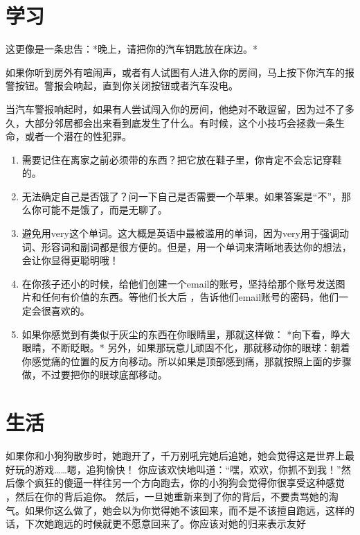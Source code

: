 \documentclass[12pt,oneside]{book}
\begin{document}
\chapter{学习}
\begin{proposition}[生活情调]
	这更像是一条忠告：*晚上，请把你的汽车钥匙放在床边。*
	
	如果你听到房外有喧闹声，或者有人试图有人进入你的房间，马上按下你汽车的报警按钮。警报会响起，直到你关闭按钮或者汽车没电。
	
	当汽车警报响起时，如果有人尝试闯入你的房间，他绝对不敢逗留，因为过不了多久，大部分邻居都会出来看到底发生了什么。有时候，这个小技巧会拯救一条生命，或者一个潜在的性犯罪。
\end{proposition}

\begin{tcolorbox}[colback=orange!5,colframe=orange!75!black]
\begin{enumerate}
\item 需要记住在离家之前必须带的东西？把它放在鞋子里，你肯定不会忘记穿鞋的。
\item 无法确定自己是否饿了？问一下自己是否需要一个苹果。如果答案是“不”，那么你可能不是饿了，而是无聊了。
\item 避免用very这个单词。这大概是英语中最被滥用的单词，因为very用于强调动词、形容词和副词都是很方便的。但是，用一个单词来清晰地表达你的想法，会让你显得更聪明哦！
\item 在你孩子还小的时候，给他们创建一个email的账号，坚持给那个账号发送图片和任何有价值的东西。等他们长大后 ，告诉他们email账号的密码，他们一定会很喜欢的。
\item 如果你感觉到有类似于灰尘的东西在你眼睛里，那就这样做：
*向下看，睁大眼睛，不断眨眼。*
另外，如果那玩意儿顽固不化，那就移动你的眼球：朝着你感觉痛的位置的反方向移动。所以如果是顶部感到痛，那就按照上面的步骤做，不过要把你的眼球底部移动。		
\end{enumerate}
\end{tcolorbox}
\chapter{生活}
\begin{proposition}[追狗狗]
如果你和小狗狗散步时，她跑开了，千万别吼完她后追她，她会觉得这是世界上最好玩的游戏……嗯，追狗愉快！
你应该欢快地叫道：“嘿，欢欢，你抓不到我！”然后像个疯狂的傻逼一样往另一个方向跑去，你的小狗狗会觉得你很享受这种感觉 ，然后在你的背后追你。
然后，一旦她重新来到了你的背后，不要责骂她的淘气。如果你这么做了，她会以为你觉得她不该回来，而不是不该擅自跑远，这样的话，下次她跑远的时候就更不愿意回来了。你应该对她的归来表示友好
\end{proposition}
\end{document}
